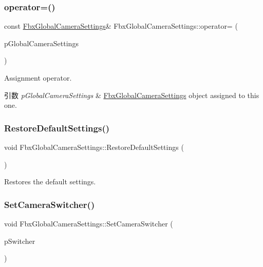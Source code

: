 \subsubsection{\texorpdfstring{operator=()}{operator=()}}
{\footnotesize\ttfamily const \hyperlink{class_fbx_global_camera_settings}{Fbx\+Global\+Camera\+Settings}\& Fbx\+Global\+Camera\+Settings\+::operator= (\begin{DoxyParamCaption}\item[{const \hyperlink{class_fbx_global_camera_settings}{Fbx\+Global\+Camera\+Settings} \&}]{p\+Global\+Camera\+Settings }\end{DoxyParamCaption})}

Assignment operator. 
\begin{DoxyParams}{引数}
{\em p\+Global\+Camera\+Settings} & \hyperlink{class_fbx_global_camera_settings}{Fbx\+Global\+Camera\+Settings} object assigned to this one. \\
\hline
\end{DoxyParams}
\mbox{\label{class_fbx_global_camera_settings_a1024ebc19b9641163a74a4cc457f8c0d}} 
\subsubsection{\texorpdfstring{Restore\+Default\+Settings()}{RestoreDefaultSettings()}}
{\footnotesize\ttfamily void Fbx\+Global\+Camera\+Settings\+::\+Restore\+Default\+Settings (\begin{DoxyParamCaption}{ }\end{DoxyParamCaption})}



Restores the default settings. 

\mbox{\label{class_fbx_global_camera_settings_ac5828573eccccf2e76529ad21f77ff3c}} 
\subsubsection{\texorpdfstring{Set\+Camera\+Switcher()}{SetCameraSwitcher()}}
{\footnotesize\ttfamily void Fbx\+Global\+Camera\+Settings\+::\+Set\+Camera\+Switcher (\begin{DoxyParamCaption}\item[{\hyperlink{class_fbx_camera_switcher}{Fbx\+Camera\+Switcher} $\ast$}]{p\+Switcher }\end{DoxyParamCaption})}

